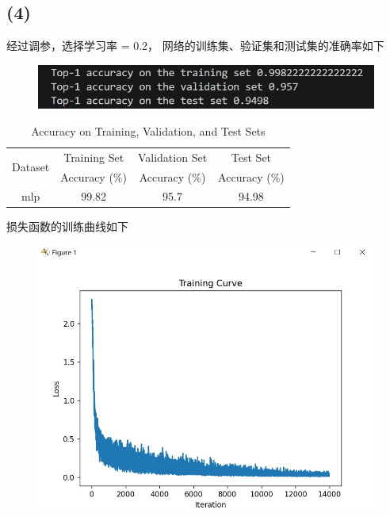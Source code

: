 \documentclass[12pt,a4paper]{article}
\begin{document}
\subsection*{(4)}
经过调参，选择学习率 = 0.2，
网络的训练集、验证集和测试集的准确率如下
\begin{figure}[H]
    \centering
    \includegraphics*{accuracy.jpg}
\end{figure}
\begin{table}[H]
    \centering
    \caption{Accuracy on Training, Validation, and Test Sets}
    {
        \begin{tabular}{|c|c|c|c|}
            \hline
            \multirow{2}{*}{Dataset} & \multicolumn{1}{c|}{Training Set} & \multicolumn{1}{c|}{Validation Set} & \multicolumn{1}{c|}{Test Set} \\ \cline{2-4}
                                     & Accuracy (\%)                     & Accuracy (\%)                       & Accuracy (\%)                 \\ \hline
            mlp                      & 99.82                             & 95.7                                & 94.98                         \\ \hline
        \end{tabular}
    }
\end{table}
损失函数的训练曲线如下
\begin{figure}[H]
    \centering
    \includegraphics*{train_curve.jpg}
\end{figure}
\end{document}
